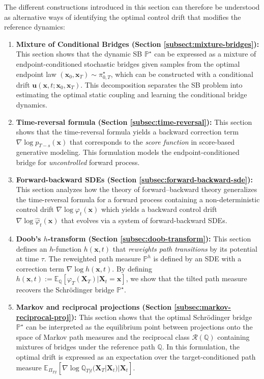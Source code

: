 \documentclass{article}
\begin{document}
The different constructions introduced in this section can therefore be understood as alternative ways of identifying the optimal control drift that modifies the reference dynamics:
\begin{enumerate}
    \item [(i)] \textbf{Mixture of Conditional Bridges (Section \ref{subsect:mixture-bridges}):} This section shows that the dynamic SB $\mathbb{P}^\star$ can be expressed as a mixture of endpoint-conditioned stochastic bridges given samples from the optimal endpoint law $(\boldsymbol{x}_0, \boldsymbol{x}_T) \sim \pi^\star_{0,T}$, which can be constructed with a conditional drift $\boldsymbol{u}(\boldsymbol{x},t;\boldsymbol{x}_0, \boldsymbol{x}_T)$. This decomposition separates the SB problem into estimating the optimal static coupling and learning the conditional bridge dynamics.
    \item [(ii)] \textbf{Time-reversal formula (Section \ref{subsec:time-reversal}):} This section shows that the time-reversal formula yields a backward correction term $\nabla \log p_{T-s}(\boldsymbol{x})$ that corresponds to the \textit{score function} in score-based generative modeling. This formulation models the endpoint-conditioned bridge for \textit{uncontrolled} forward process. 
    \item [(iii)] \textbf{Forward-backward SDEs (Section \ref{subsec:forward-backward-sde}):} This section analyzes how the theory of forward–backward theory generalizes the time-reversal formula for a forward process containing a non-deterministic control drift $\nabla \log \varphi_t(\boldsymbol{x})$ which yields a backward control drift $\nabla \log \hat\varphi_t(\boldsymbol{x})$ that evolves via a system of forward-backward SDEs.
    \item[(iv)] \textbf{Doob's $h$-transform (Section \ref{subsec:doob-transform}):} This section defines an $h$-function $h(\boldsymbol{x},t)$ that \textit{reweights path transitions} by its potential at time $\tau$. The reweighted path measure $\mathbb{P}^h$ is defined by an SDE with a correction term $\nabla \log h(\boldsymbol{x},t)$. By defining $h(\boldsymbol{x},t):= \mathbb{E}_{\mathbb{Q}}[\varphi_T(\boldsymbol{X}_T)|\boldsymbol{X}_t=\boldsymbol{x}]$, we show that the tilted path measure recovers the Schrödinger bridge $\mathbb{P}^\star$.
    \item[(v)] \textbf{Markov and reciprocal projections (Section \ref{subsec:markov-reciprocal-proj}):} This section shows that the optimal Schrödinger bridge $\mathbb{P}^\star$ can be interpreted as the equilibrium point between projections onto the space of Markov path measures and the reciprocal class $\mathcal{R}(\mathbb{Q})$ containing mixtures of bridges under the reference path $\mathbb{Q}$. In this formulation, the optimal drift is expressed as an expectation over the target-conditioned path measure $\mathbb{E}_{\Pi_{T|t}}[\nabla  \log \mathbb{Q}_{T|t}(\boldsymbol{X}_T|\boldsymbol{X}_t) |\boldsymbol{X}_t]$. 

\end{enumerate}
\end{document}
